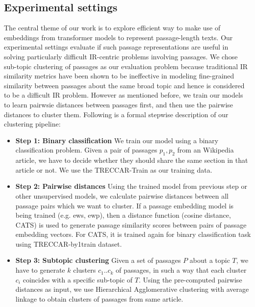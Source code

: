 \documentclass[sigconf,authordraft]{acmart}
\begin{document}
\subsection{Experimental settings} The central theme of our work is to explore efficient way to make use of embeddings from transformer models to represent passage-length texts. Our experimental settings evaluate if such passage representations are useful in solving particularly difficult IR-centric problems involving passages. We chose sub-topic clustering of passages as our evaluation problem because traditional IR similarity metrics have been shown to be ineffective in modeling fine-grained similarity between passages about the same broad topic and hence is considered to be a difficult IR problem. However as mentioned before, we train our models to learn pairwsie distances between passages first, and then use the pairwise distances to cluster them. Following is a formal stepwise description of our clustering pipeline:
\begin{itemize}
    \item \textbf{Step 1: Binary classification} We train our model using a binary classification problem. Given a pair of passages $p_1, p_2$ from an Wikipedia article, we have to decide whether they should share the same section in that article or not. We use the TRECCAR-Train as our training data.
    \item \textbf{Step 2: Pairwise distances} Using the trained model from previous step or other unsupervised models, we calculate pairwise distances between all passage pairs which we want to cluster. If a passage embedding model is being trained (e.g. ews, ewp), then a distance function (cosine distance, CATS) is used to generate passage similarity scores between pairs of passage embedding vectors. For CATS, it is trained again for binary classification task using TRECCAR-by1train dataset.
    \item \textbf{Step 3: Subtopic clustering} Given a set of passages $P$ about a topic $T$, we have to generate $k$ clusters $c_1 .. c_k$ of passages, in such a way that each cluster $c_i$ coincides with a specific sub-topic of $T$. Using the pre-computed pairwise distances as input, we use Hierarchical Agglomerative clustering with average linkage to obtain clusters of passages from same article.
\end{itemize}
\end{document}
